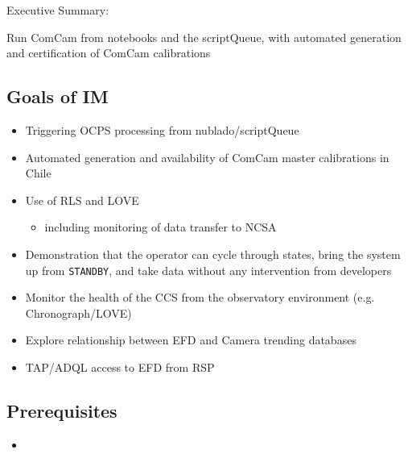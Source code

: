 
Executive Summary:

Run ComCam from notebooks and the scriptQueue, with automated generation and certification of ComCam calibrations

\subsection{Goals of IM}
\label{sec:org3154347}
\begin{itemize}
\item Triggering \gls{OCPS} processing from nublado/scriptQueue
\item Automated generation and availability of ComCam master calibrations in Chile
\item Use of \gls{RLS} and \gls{LOVE}
\begin{itemize}
\item including monitoring of data transfer to NCSA
\end{itemize}
\item Demonstration that the operator can cycle through states, bring
the system up from \texttt{STANDBY}, and take data without any intervention from developers
\item Monitor the health of the \gls{CCS} from the observatory environment (e.g. Chronograph/\gls{LOVE})
\item Explore relationship between \gls{EFD} and Camera trending databases
\item TAP/ADQL access to \gls{EFD} from \gls{RSP}
\end{itemize}

\subsection{Prerequisites}
\begin{itemize}
\item{}
\end{itemize}

